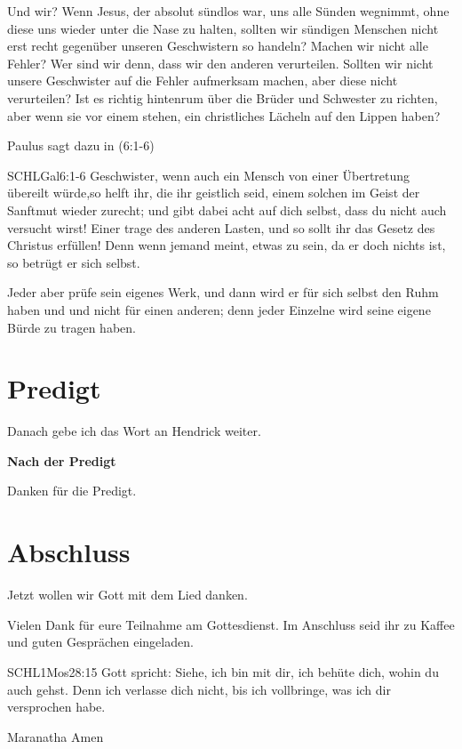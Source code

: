 \documentclass{../../inc/mybib}
\begin{document}
\begin{spacing}{1.5}
Und wir? Wenn Jesus, der absolut sündlos war, uns alle Sünden wegnimmt, ohne diese uns wieder unter die Nase zu halten, sollten wir sündigen Menschen nicht erst recht gegenüber unseren Geschwistern so handeln? Machen wir nicht alle Fehler? Wer sind wir denn, dass wir den anderen verurteilen. Sollten wir nicht unsere Geschwister auf die Fehler aufmerksam machen, aber diese nicht verurteilen? Ist es richtig hintenrum über die Brüder und Schwester zu richten, aber wenn sie vor einem stehen, ein christliches Lächeln auf den Lippen haben? 

Paulus sagt dazu in (6:1-6)
\begin{bibeltext}{SCHL}{Gal}{6:1-6}
    Geschwister, wenn auch ein Mensch von einer Übertretung übereilt würde,so helft ihr, die ihr geistlich seid, einem solchen im Geist der Sanftmut wieder zurecht; und gibt dabei acht auf dich selbst, dass du nicht auch versucht wirst! Einer trage des anderen Lasten, und so sollt ihr das Gesetz des Christus erfüllen! Denn wenn jemand meint, etwas zu sein, da er doch nichts ist, so betrügt er sich selbst.

    Jeder aber prüfe sein eigenes Werk, und dann wird er für sich selbst den Ruhm haben und und nicht für einen anderen; denn jeder Einzelne wird seine eigene Bürde zu tragen haben.
\end{bibeltext}
\end{spacing}

\section{Predigt}

Danach gebe ich das Wort an Hendrick weiter.

\textbf{Nach der Predigt}

Danken für die Predigt.






\section{Abschluss}

Jetzt wollen wir Gott mit dem Lied  danken.

Vielen Dank für eure Teilnahme am Gottesdienst. Im Anschluss seid ihr zu Kaffee und guten Gesprächen eingeladen.
\beten{}

\begin{bibelbox}{SCHL}{1Mos}{28:15}
Gott spricht: Siehe, ich bin mit dir,
ich behüte dich, wohin du auch gehst.
Denn ich verlasse dich nicht,
bis ich vollbringe, was ich dir versprochen habe.
\end{bibelbox}

Maranatha Amen
\end{document}

